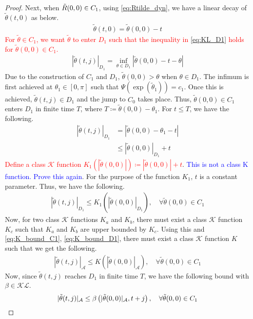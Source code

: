 \documentclass{article}
\newcommand{\brackets}[1]{\left(#1\right)}
\newcommand{\textblue}[1]{\textcolor{blue}{#1}}
\begin{document}
\begin{proof}
    Next, when $\Tilde{R}(0,0)\in C_1$, using \eqref{eq:Rtilde_dyn}, we have a linear decay of $\tilde\theta(t, 0)$ as below. 
    \begin{align}
        \tilde{\theta}(t, 0) = \tilde{\theta}(0,0) - t
    \end{align}
    \textcolor{red}{For $\tilde{\theta}\in C_1$, we want $\tilde{\theta}$ to enter $D_1$ such that the inequality in \eqref{eq:KL_D1} holds for $\tilde\theta(0,0)\in C_1$.}
    \begin{align*}
    |\tilde{\theta}(t, j)|_{D_1} = \inf_{\theta\in D_1} |\tilde{\theta}(0,0) - t - {\theta}|
    \end{align*}
    Due to the construction of $C_1$ and $D_1$, $\tilde\theta(0,0) > \theta$ when $\theta\in D_1$. The infimum is first achieved at $\theta_1 \in [0,\pi]$ such that $\Psi\brackets{\exp(\tilde{{\theta}}_1)} = c_1$. Once this is achieved, $\tilde{\theta}(t,j)\in D_1$ and the jump to $C_0$ takes place. Thus, $\tilde{\theta}(0,0)\in C_1$ enters $D_1$ in finite time $T$, where $T \coloneqq \tilde\theta(0,0) - \theta_1$. For $t \leq T$, we have the following.
    \begin{align}
        |\tilde{\theta}(t, j)|_{D_1} &= |\tilde\theta(0,0) - \theta_1 - t|\nonumber\\
        & \leq |\tilde\theta(0,0)|_{D_1} + t
    \end{align}
    \textcolor{red}{Define a class $\mathcal{K}$ function $K_1(|\tilde\theta(0,0)|) \coloneqq |\tilde\theta(0,0)| + t$}. \textblue{This is not a class K function. Prove this again}. For the purpose of the function $K_1$, $t$ is a constant parameter. Thus, we have the following. 
    \begin{align}\label{eq:K_bound_C1}
        |\tilde\theta (t, j)|_{D_1} \leq K_1(|\tilde\theta(0,0)|_{D_1}), \quad \forall \tilde{\theta}(0,0) \in C_1
    \end{align}
    Now, for two class $\mathcal{K}$ functions $K_a$ and $K_b$, there must exist a class $\mathcal{K}$ function $K_c$ such that $K_a$ and $K_b$ are upper bounded by $K_c$. Using this and \eqref{eq:K_bound_C1}, \eqref{eq:K_bound_D1}, there must exist a class $\mathcal{K}$ function $K$ such that we get the following.
    \begin{align}\label{eq:K_bound_final_C1}
        |\tilde{\theta}(t, j)|_\mathcal{A}\leq K(|\tilde{\theta}(0,0)|_{\mathcal{A}}), \quad \forall \tilde\theta(0,0) \in C_1
    \end{align}
    Now, since $\tilde\theta(t,j)$ reaches $D_1$ in finite time $T$, we have the following bound with $\beta\in \mathcal{KL}$.
    \begin{align}\label{eq:KL_C1}
        |\Tilde{\theta}(t, j)|_\mathcal{A} \leq \beta\brackets{|\tilde{\theta}(0, 0)|_\mathcal{A}, t+j}, \quad \forall \tilde{\theta}(0, 0) \in C_1
    \end{align}


\end{proof}
\end{document}
